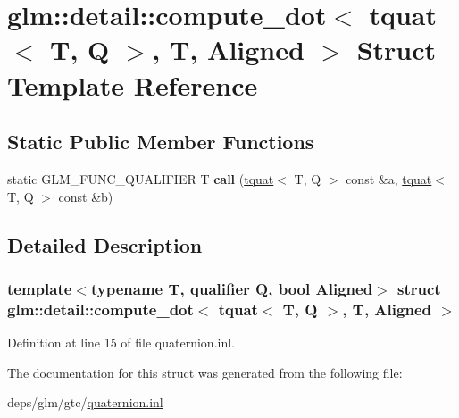 \hypertarget{structglm_1_1detail_1_1compute__dot_3_01tquat_3_01T_00_01Q_01_4_00_01T_00_01Aligned_01_4}{}\section{glm\+:\+:detail\+:\+:compute\+\_\+dot$<$ tquat$<$ T, Q $>$, T, Aligned $>$ Struct Template Reference}
\label{structglm_1_1detail_1_1compute__dot_3_01tquat_3_01T_00_01Q_01_4_00_01T_00_01Aligned_01_4}
\subsection*{Static Public Member Functions}
\begin{DoxyCompactItemize}
\item 
\mbox{\label{structglm_1_1detail_1_1compute__dot_3_01tquat_3_01T_00_01Q_01_4_00_01T_00_01Aligned_01_4_ac79d12e6b66d07899eb772d781a2ee97}} 
static G\+L\+M\+\_\+\+F\+U\+N\+C\+\_\+\+Q\+U\+A\+L\+I\+F\+I\+ER T {\bfseries call} (\hyperlink{structglm_1_1tquat}{tquat}$<$ T, Q $>$ const \&a, \hyperlink{structglm_1_1tquat}{tquat}$<$ T, Q $>$ const \&b)
\end{DoxyCompactItemize}


\subsection{Detailed Description}
\subsubsection*{template$<$typename T, qualifier Q, bool Aligned$>$\newline
struct glm\+::detail\+::compute\+\_\+dot$<$ tquat$<$ T, Q $>$, T, Aligned $>$}



Definition at line 15 of file quaternion.\+inl.



The documentation for this struct was generated from the following file\+:\begin{DoxyCompactItemize}
\item 
deps/glm/gtc/\hyperlink{gtc_2quaternion_8inl}{quaternion.\+inl}\end{DoxyCompactItemize}
